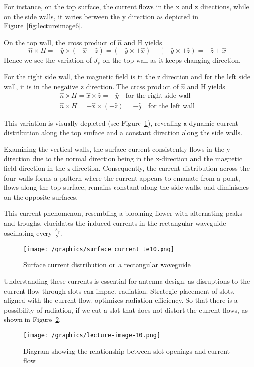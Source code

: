 For instance, on the top surface, the current flows in the x and z directions, while on the side walls, it varies between the y direction as depicted in Figure~\ref{fig:lectureimage6}.

On the top wall, the cross product of $\hat{n}$ and H yields
\begin{dmath*}
\hat{n} \times H
= -\hat{y} \times (\pm\hat{x} \pm\hat{z})
= (-\hat{y} \times \pm\hat{x}) + (- \hat{y} \times \pm\hat{z})
= \pm\hat{z} \pm\hat{x}
\end{dmath*}
Hence we see the variation of $J_{s}$ on the top wall as it keeps changing direction.

For the right side wall, the magnetic field is in the z direction and for the left side wall, it is in the negative z direction. The cross product of $\hat{n}$ and H yields
\begin{align*}
\hat{n} \times H = \hat{x} \times \hat{z} = -\hat{y}\quad\text{for the right side wall}\\
\hat{n} \times H = -\hat{x} \times (-\hat{z}) = -\hat{y}\quad\text{for the left wall}
\end{align*}

This variation is visually depicted (see Figure~\ref{fig:surface_current_te10}), revealing a dynamic current distribution along the top surface and a constant direction along the side walls.

Examining the vertical walls, the surface current consistently flows in the y-direction due to the normal direction being in the x-direction and the magnetic field direction in the z-direction. Consequently, the current distribution across the four walls forms a pattern where the current appears to emanate from a point, flows along the top surface, remains constant along the side walls, and diminishes on the opposite surfaces.
	
This current phenomenon, resembling a blooming flower with alternating peaks and troughs, elucidates the induced currents in the rectangular waveguide oscillating every $\frac{\lambda_g}{2}$.
\begin{figure}[h]
\centering
\texttt{[image: /graphics/surface\_current\_te10.png]}
\caption{Surface current distribution on a rectangular waveguide}
\label{fig:surface_current_te10}
\end{figure}

Understanding these currents is essential for antenna design, as disruptions to the current flow through slots can impact radiation. Strategic placement of slots, aligned with the current flow, optimizes radiation efficiency.  So that there is a possibility of radiation, if we cut a slot that does not distort the current flows, as shown in Figure~\ref{fig:lectureimage10}.
\begin{figure}[h]
\centering
\texttt{[image: /graphics/lecture-image-10.png]}
\caption{Diagram showing the relationship between slot openings and current flow}
\label{fig:lectureimage10}
\end{figure}

